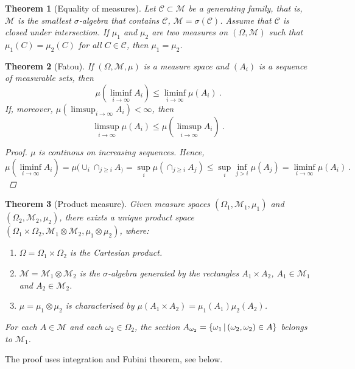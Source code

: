 \documentclass[12pt,a4paper]{amsart}
\theoremstyle{plain}%
\newtheorem{theorem}{Theorem}%
\theoremstyle{definition}
\theoremstyle{remark}
\begin{document}
\begin{theorem}[Equality of measures] Let $\mathcal C \subset \mathcal M$ be a
  generating family, that is, $\mathcal M$ is the smallest
  $\sigma$-algebra that contains $\mathcal C$, $\mathcal M =
  \sigma(\mathcal C)$. Assume that $\mathcal C$ is closed under
  intersection. If $\mu_1$ and $\mu_2$ are two measures on
  $(\Omega,\mathcal M)$ such that $\mu_1(C) = \mu_2(C)$ for all $C \in
  \mathcal C$, then $\mu_1 = \mu_2$. 
\end{theorem}

\begin{theorem}[Fatou]
If $(\Omega,\mathcal M,\mu)$ is a measure space and $(A_i)$ is a
sequence of measurable sets, then
\begin{equation*}
  \mu(\liminf_{i\to\infty} A_i) \leq \liminf_{i\to\infty} \mu(A_i) \ .
\end{equation*}
If, moreover, $\mu(\limsup_{i\to\infty} A_i) < \infty$, then
\begin{equation*}
  \limsup_{i\to\infty} \mu(A_i) \leq \mu(\limsup_{i\to\infty} A_i) \ .
\end{equation*}
\begin{proof}
$\mu$ is continous on increasing sequences. Hence,
  \begin{equation*}
\mu(\liminf_{i\to\infty} A_i) = \mu(\cup_i \cap_{j\ge i} A_) = \sup_i
\mu(\cap_{j \geq i} A_j) \leq \sup_i \inf_{j > i} \mu(A_j) =
\liminf_{i\to\infty} \mu(A_i) \ .   
  \end{equation*}
\end{proof}
\end{theorem}
\begin{theorem}[Product measure] Given measure spaces
  $(\Omega_1,\mathcal M_1,\mu_1)$ and $(\Omega_2,\mathcal M_2,\mu_2)$,
  there exixts a unique \emph{product space} $(\Omega_1 \times
  \Omega_2, \mathcal M_1 \otimes \mathcal M_2, \mu_1 \otimes \mu_2)$, where:
  \begin{enumerate}
  \item $\Omega = \Omega_1 \times \Omega _2$ is the Cartesian product.
  \item $\mathcal M = \mathcal M_1 \otimes \mathcal M_2$ is the
    $\sigma$-algebra generated by the rectangles $A_1 \times A_2$,
    $A_1 \in \mathcal M_1$ and $A_2 \in \mathcal M_2$. 
  \item $\mu = \mu_1 \otimes \mu_2$ is characterised by $\mu(A_1
    \times A_2) = \mu_1(A_1) \mu_2(A_2)$.
  \end{enumerate}
For each $A \in \mathcal M$ and each $\omega_2 \in \Omega_2$, the
section $A_{\omega_2} = \left\{\omega_1 \, \middle| \, (\omega_2,\omega_2) \in A \right\}$
belongs to $\mathcal M_1$.
\end{theorem}
The proof uses integration and Fubini theorem, see below.
\end{document}

